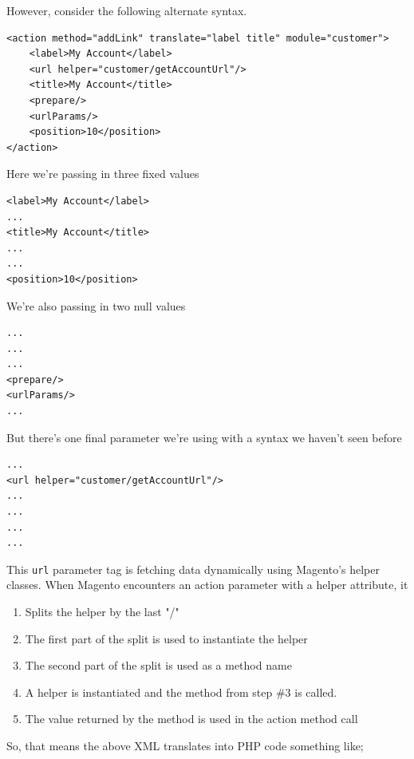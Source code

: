 \documentclass[oneside]{book}
\begin{document}
However, consider the following alternate syntax.

\begin{lstlisting}
<action method="addLink" translate="label title" module="customer">
    <label>My Account</label>
    <url helper="customer/getAccountUrl"/>
    <title>My Account</title>
    <prepare/>
    <urlParams/>
    <position>10</position>
</action>

\end{lstlisting}


Here we're passing in three fixed values

\begin{lstlisting}
<label>My Account</label>
...
<title>My Account</title>
...
...
<position>10</position>

\end{lstlisting}


We're also passing in two null values

\begin{lstlisting}
...
...
...
<prepare/>
<urlParams/>
...

\end{lstlisting}


But there's one final parameter we're using with a syntax we haven't seen before

\begin{lstlisting}
...
<url helper="customer/getAccountUrl"/>
...
...
...
...

\end{lstlisting}


This \footnotesize\texttt{url} \normalsize  parameter tag is fetching data dynamically using Magento's helper classes.  When Magento encounters an action parameter with a helper attribute, it

\begin{enumerate}
\item Splits the helper by the last "/"
\item The first part of the split is used to instantiate the helper
\item The second part of the split is used as a method name
\item A helper is instantiated and the method from step \#3 is called.
\item The value returned by the method is used in the action method call
\end{enumerate}


So, that means the above XML translates into PHP code something like;
\end{document}
